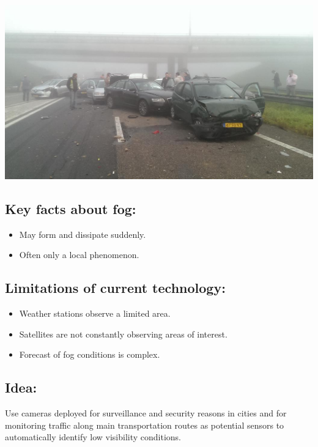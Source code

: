 \documentclass{article}
\begin{document}
\begin{minipage}[b]{\columnwidth}
	\begin{center}
	\includegraphics[width=0.9\columnwidth]{Accident}
	\label{figAccident}
	\end{center}
\end{minipage}
\vspace{-2cm}

\subsection*{Key facts about fog:}
\begin{itemize}
  \item May form and dissipate suddenly.
  \item Often only a local phenomenon.
\end{itemize}

\subsection*{Limitations of current technology:}
\begin{itemize}
\item Weather stations observe a limited area.
\item Satellites are not constantly observing areas of interest.
\item Forecast of fog conditions is complex.
\end{itemize}

\subsection*{Idea:}
Use cameras deployed for surveillance and security reasons in cities and for monitoring traffic along
main transportation routes as potential sensors to
automatically identify low visibility conditions.
\end{document}
